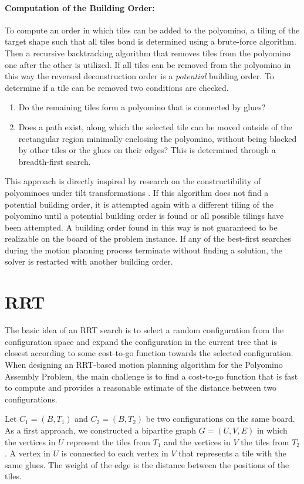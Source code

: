 \paragraph{Computation of the Building Order:}
To compute an order in which tiles can be added to the polyomino, a tiling of the target shape such that all tiles bond is determined using a brute-force algorithm.
Then a recursive backtracking algorithm that removes tiles from the polyomino one after the other is utilized. If all tiles can be removed from the polyomino in this way the reversed deconstruction order is a \emph{potential} building order. To determine if a tile can be removed two conditions are checked.
\begin{enumerate}
\item Do the remaining tiles form a polyomino that is connected by glues?
\item Does a path exist, along which the selected tile can be moved outside of the rectangular region minimally enclosing the polyomino, without being blocked by other tiles or the glues on their edges? This is determined through a breadth-first search.
\end{enumerate}
This approach is directly inspired by research on the constructibility of polyominoes under tilt transformations \cite{Becker2017}.
If this algorithm does not find a potential building order, it is attempted again with a different tiling of the polyomino until a potential building order is found or all possible tilings have been attempted.
A building order found in this way is not guaranteed to be realizable on the board of the problem instance. If any of the best-first searches during the motion planning process terminate without finding a solution, the solver is restarted with another building order.


\section{RRT}
The basic idea of an RRT search is to select a random configuration from the configuration space and expand the configuration in the current tree that is closest according to some cost-to-go function towards the selected configuration. When designing an RRT-based motion planning algorithm for the Polyomino Assembly Problem, the main challenge is to find a cost-to-go function that is fast to compute and provides a reasonable estimate of the distance between two configurations. \par
Let $C_1 = (B, T_1)$ and $C_2 = (B, T_2)$ be two configurations on the same board. 
As a first approach, we constructed a bipartite graph $G = (U, V, E)$ in which the vertices in $U$ represent the tiles from $T_1$ and the vertices in $V$ the tiles from $T_2$. A vertex in $U$ is connected to each vertex in $V$ that represents a tile with the same glues. The weight of the edge is the distance between the positions of the tiles.

